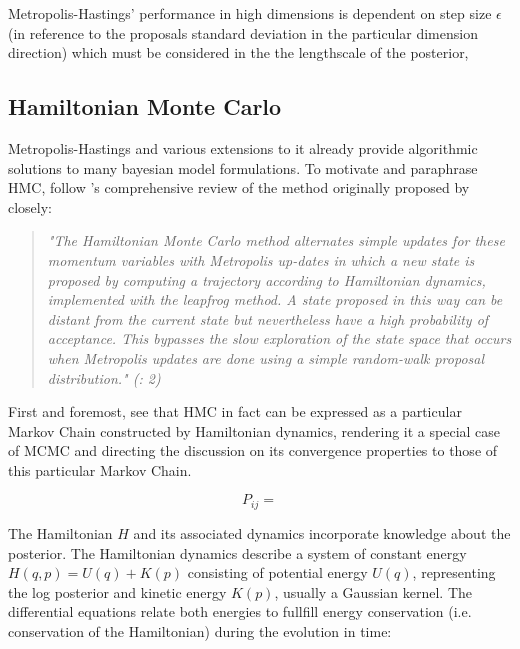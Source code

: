 \documentclass[11pt]{article}
\begin{document}
        \cite{mackay2003information} Metropolis-Hastings' performance in high dimensions is dependent on step size $\epsilon$ (in reference to the proposals standard deviation in the particular dimension direction) which must be considered in the the lengthscale of the posterior,  %




        \subsection{Hamiltonian Monte Carlo}
        Metropolis-Hastings and various extensions to it already provide algorithmic solutions to many bayesian model formulations.
        To motivate and paraphrase HMC, follow  \cite{neal2011mcmc}'s comprehensive review of the method originally proposed by %
        closely:

        \begin{quote}
            \it{"The Hamiltonian Monte Carlo method alternates simple updates for these momentum variables with Metropolis up-dates in which a new state is proposed by computing a trajectory according to Hamiltonian dynamics, implemented with the leapfrog method. A state proposed in this way can be distant from the current state but nevertheless have a high probability of acceptance. This bypasses the slow exploration of the state space that occurs when Metropolis updates are done using a simple random-walk proposal distribution."}   \normalfont     (\cite{neal2011mcmc}: 2)
        \end{quote}

        First and foremost, see that HMC in fact can be expressed as a particular Markov Chain constructed by Hamiltonian dynamics, rendering it a special case of MCMC and directing the discussion on its convergence properties to those of this particular Markov Chain.

        \begin{equation}
            P_{ij} =
        \end{equation} %

        The Hamiltonian $H$ and its associated dynamics incorporate knowledge about the posterior. The Hamiltonian dynamics describe a system of constant energy $H(q,p) = U(q) + K(p)$ consisting of potential energy $U(q)$, representing the log posterior and kinetic energy $K(p)$, usually a Gaussian kernel. The differential equations relate both energies to fullfill energy conservation (i.e. conservation of the Hamiltonian) during the evolution in time:
\end{document}
